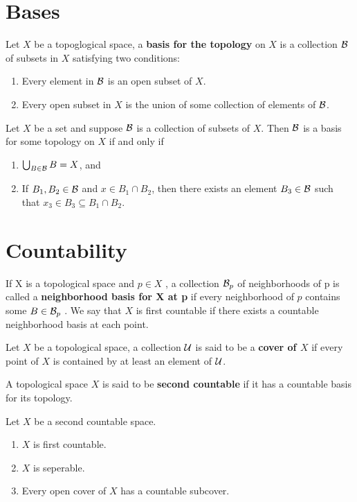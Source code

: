 \section{Bases}
\begin{definition}
    Let $X$ be a topoglogical space, a \textbf{basis for the topology} on $X$ is a collection $\mathcal{B}$ of subsets in $X$ satisfying two conditions:
    \begin{enumerate}
        \item Every element in $\mathcal{B}$ is an open subset of $X$.
        \item Every open subset in $X$ is the union of some collection of elements of $\mathcal{B}$.
    \end{enumerate}
\end{definition}
\begin{theorem}
    Let $X$ be a set and suppose $\mathcal{B}$ is a collection of subsets of $X$. Then $\mathcal{B}$ is a basis for some topology on $X$ if and only if 
    \begin{enumerate}
        \item $\bigcup_{B \in \mathcal{B}}B = X$, and 
        \item If $B_1,B_2 \in \mathcal{B}$ and $x \in B_1 \cap B_2$, then there exists an element $B_3 \in \mathcal{B}$ such that $x_3 \in B_3 \subseteq B_1 \cap B_2$.
    \end{enumerate}
\end{theorem}
\section{Countability}
\begin{definition}
    If X is a topological space and $p \in X$ , a collection $\mathcal{B}_p$ of neighborhoods of p is called a \textbf{neighborhood basis for X at p} if every neighborhood of $p$ contains some $B \in \mathcal{B}_p$ . We say that $X$ is first countable if there exists a countable neighborhood basis at each point.
\end{definition}
\begin{definition}
    Let $X$ be a topological space, a collection $\mathcal{U}$ is said to be a \textbf{cover of $X$} if every point of $X$ is contained by at least an element of $\mathcal{U}$.
\end{definition}
\begin{definition}
    A topological space $X$ is said to be \textbf{second countable} if it has a countable basis for its topology.
\end{definition}
\begin{lemma}
    Let $X$ be a second countable space.
    \begin{enumerate}[itemsep=0pt]
        \item $X$ is first countable.
        \item $X$ is seperable.
        \item Every open cover of $X$ has a countable subcover.
    \end{enumerate}
\end{lemma}
